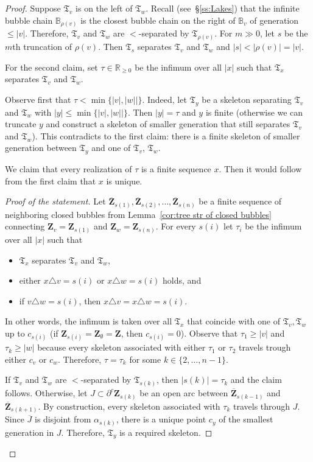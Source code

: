 \documentclass{amsart}
\newcommand{\1}{{\mathbb 1 }}
\newcommand{\skel}{{\mathfrak T}}
\newcommand{\bB}{{\mathbb{B}}}
\newcommand{\bZ}{{\mathbf Z}}
\newcommand{\R}{\mathbb{R}}
\theoremstyle{remark}
\numberwithin{equation}{section}
\theoremstyle{definition}
\theoremstyle{nonumberbreak}
\begin{document}
\begin{proof}
Suppose $\skel_v$ is on the left of $\skel_w$. Recall (see~\S\ref{ss:Lakes}) that the infinite bubble chain $\bB_{\rho(v)}$ is the closest bubble chain on the right of $\bB_v$ of generation $\le |v|$. Therefore, $\skel_v$ and $\skel_w$ are $<$-separated by $\skel_{\rho(v)}$. For $m\gg 0$, let $s$ be the $m$th truncation of $\rho(v)$. Then $\skel_s$ separates $\skel_v$ and $\skel_w$ and $|s|<|\rho(v)| = |v|$.

For the second claim, set $\tau\in \R_{\ge 0}$ be the infimum over all $|x|$ such that $\skel_x$ separates $\skel_v$ and $\skel_w$. 

Observe first that $\tau<\min\{|v|,|w||\}$. Indeed, let $\skel_y$ be a skeleton separating $\skel_v$ and $\skel_w$ with $|y|\le \min\{|v|,|w||\}$. Then $|y|=\tau$ and $y$ is finite (otherwise we can truncate $y$ and construct a skeleton of smaller generation that still separates $\skel_v$ and $\skel_w$). This contradicts to the first claim: there is a finite skeleton of smaller generation between $\skel_y$ and one of $\skel_v$, $\skel_w$.


We claim that every realization of $\tau$ is a finite sequence $x$. Then it would follow from the first claim that $x$ is unique.
\begin{proof}[Proof of the statement]
Let $\overline \bZ_{s(1)},\overline \bZ_{s(2)}, \dots , \overline \bZ_{s(n)} $ be a finite sequence of neighboring closed bubbles from Lemma~\ref{cor:tree str of closed bubbles} connecting $\bZ_v=\bZ_{s(1)}$ and $\bZ_w=\bZ_{s(n)}$. For every $s(i)$ let $\tau_i$ be the infimum over all $|x|$ such that 
\begin{itemize}
\item $\skel_x$ separates $\skel_v$ and $\skel_w$,
\item either $x\triangle v= s(i)$ or $x\triangle w= s(i)$ holds, and
\item if $v\triangle w= s(i)$, then  $x\triangle v= x\triangle w= s(i)$.
\end{itemize}
 In other words, the infimum is taken over all $\skel_x$ that coincide with one of $\skel_v,\skel_w$ up to $c_{s(i)}$ (if $\bZ_{s(i)}=\bZ_{\emptyset}=\bZ$, then $c_{s(i)}=0$). Observe that $\tau_1 \ge |v|$ and $\tau_k\ge |w|$ because every skeleton associated with either $\tau_1$ or $\tau_2$ travels trough either $c_v$ or $c_w$. Therefore, $\tau=\tau_k$ for some $k\in \{2,\dots, n-1\}$.


If $\skel_v$ and $\skel_w$ are $<$-separated by $\skel_{s(k)}$, then $|s(k)|=\tau_k$ and the claim follows. Otherwise, let $J\subset \partial^c \bZ_{s(k)}$ be an open arc between $\overline \bZ_{s(k-1)}$ and  $\overline \bZ_{s(k+1)}$. By construction, every skeleton associated with $\tau_k$ travels through $J$. Since $\overline J$ is disjoint from $\alpha_{s(k)}$, there is a unique point $c_y$ of the smallest generation in $J$. Therefore, $\skel_y$ is a required skeleton. 
\end{proof}
\end{proof}
\end{document}
